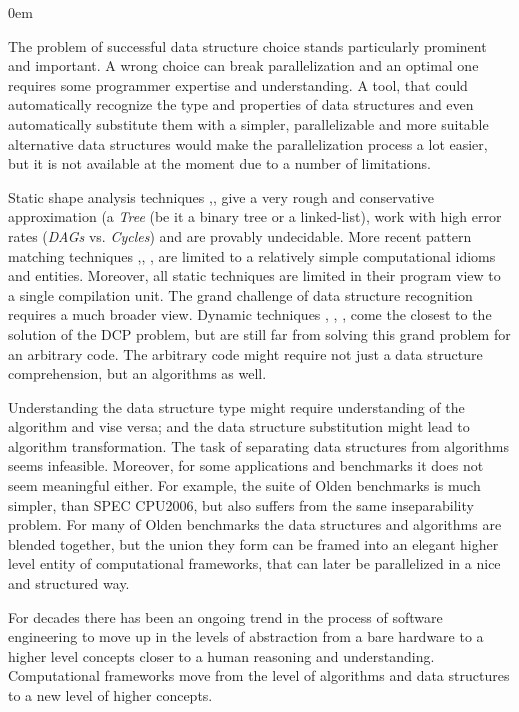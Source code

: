 \begin{description}[style=unboxed,leftmargin=0cm]
\itemsep0em
\item[\textit{Data-centric parallelization (DCP) problem}] The problem of successful data structure choice stands particularly prominent and important. A wrong choice can break parallelization and an optimal one requires some programmer expertise and understanding. A tool, that could automatically recognize the type and properties of data structures and even automatically substitute them with a simpler, parallelizable and more suitable alternative data structures would make the parallelization process a lot easier, but it is not available at the moment due to a number of limitations.  
\item[\textit{Limitations of "The state of the art" work}] Static shape analysis techniques \cite{Sagiv:1999:PSA:292540.292552},\cite{Wilhelm:2000:SA:647476.760384}, \cite{Ghiya:1996:TDC:237721.237724}
give a very rough and conservative approximation (a \textit{Tree} (be it a binary tree or a linked-list), work with high error rates (\textit{DAGs} vs. \textit{Cycles}) and are provably undecidable. More recent pattern matching techniques \cite{Ginsbach:2018:CDS:3178372.3179515},\cite{Ginsbach:2017:DEG:3049832.3049862}, \cite{Ginsbach:2018:AML:3296957.3173182},\cite{Ginsbach:2018:AML:3296957.3173182} are limited to a relatively simple computational idioms and entities. Moreover, all static techniques are limited in their program view to a single compilation unit. The grand challenge of data structure recognition requires a much broader view. Dynamic techniques \cite{Rupprecht:2017:DID:3155562.3155607}\cite{Haller:2016:SDS:2938006.2938029}, \cite{Haller:2016:SDS:2938006.2938029}, \cite{Rupprecht:2017:DID:3155562.3155607}, \cite{1669122} come the closest to the solution of the DCP problem, but are still far from solving this grand problem for an arbitrary code. The arbitrary code might require not just a data structure comprehension, but an algorithms as well. 
\item[\textit{Data structure and algorithm inseparability}] Understanding the data structure type might require understanding of the algorithm and vise versa; and the data structure substitution might lead to algorithm transformation. The task of separating data structures from algorithms seems infeasible. Moreover, for some applications and benchmarks it does not seem meaningful either. For example, the suite of Olden benchmarks is much simpler, than SPEC CPU2006, but also suffers from the same inseparability problem. For many of Olden benchmarks the data structures and algorithms are blended together, but the union they form can be framed into an elegant higher level entity of computational frameworks, that can later be parallelized in a nice and structured way.
\item[\textit{The ever-going trend to higher abstraction levels}] For decades there has been an ongoing trend in the process of software engineering to move up in the levels of abstraction from a bare hardware to a higher level concepts closer to a human reasoning and understanding. Computational frameworks move from the level of algorithms and data structures to a new level of higher concepts.
\end{description}

